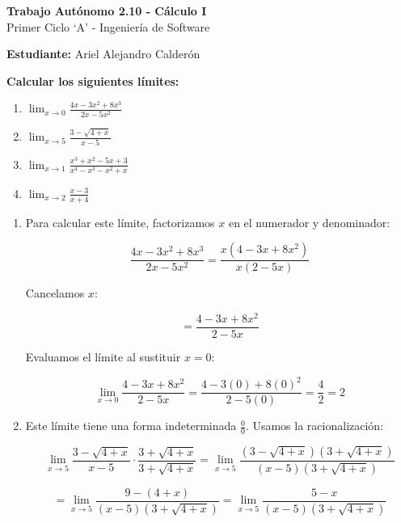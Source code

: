 \documentclass[answers]{exam} %
\begin{document}
\begin{center}
	\large\textbf{Trabajo Autónomo 2.10 - Cálculo I}\\[1em]
	\large Primer Ciclo \enquote*{A} - Ingeniería de Software\\[1em]
\end{center}

\vspace{0.5cm}
\large\textbf{Estudiante:} Ariel Alejandro Calderón
\vspace{0.5cm}

\begin{questions}

	\question \large\textbf{Calcular los siguientes límites:}
	\begin{enumerate}[label=\alph*.]
		\item $\displaystyle \lim_{x\to{0}} \frac{4x-3x^2+8x^3}{2x-5x^2}$
		\item $\displaystyle \lim_{x\to{5}} \frac{3-\sqrt{4+x}}{x-5}$
		\item $\displaystyle \lim_{x\to{1}} \frac{x^3+x^2-5x+3}{x^4-x^3-x^2+x}$
		\item $\displaystyle \lim_{x\to{2}} \frac{x-3}{x+4}$
	\end{enumerate}
	\begin{solution}
		\begin{enumerate}[label=\alph*.]
			\item Para calcular este límite, factorizamos \(x\) en el numerador y denominador:

			      \[
				      \frac{4x-3x^2+8x^3}{2x-5x^2} = \frac{x(4-3x+8x^2)}{x(2-5x)}
			      \]

			      Cancelamos \(x\):

			      \[
				      = \frac{4-3x+8x^2}{2-5x}
			      \]

			      Evaluamos el límite al sustituir \(x = 0\):

			      \[
				      \lim_{x\to{0}} \frac{4-3x+8x^2}{2-5x} = \frac{4-3(0)+8(0)^2}{2-5(0)} = \frac{4}{2} = 2
			      \]

			\item Este límite tiene una forma indeterminada \( \frac{0}{0} \). Usamos la racionalización:

			      \[
				      \lim_{x\to{5}} \frac{3-\sqrt{4+x}}{x-5} \cdot \frac{3+\sqrt{4+x}}{3+\sqrt{4+x}} = \lim_{x\to{5}} \frac{(3-\sqrt{4+x})(3+\sqrt{4+x})}{(x-5)(3+\sqrt{4+x})}
			      \]

			      \[
				      = \lim_{x\to{5}} \frac{9 - (4+x)}{(x-5)(3+\sqrt{4+x})} = \lim_{x\to{5}} \frac{5-x}{(x-5)(3+\sqrt{4+x})}
			      \]


\end{enumerate}
\end{solution}
\end{questions}
\end{document}
